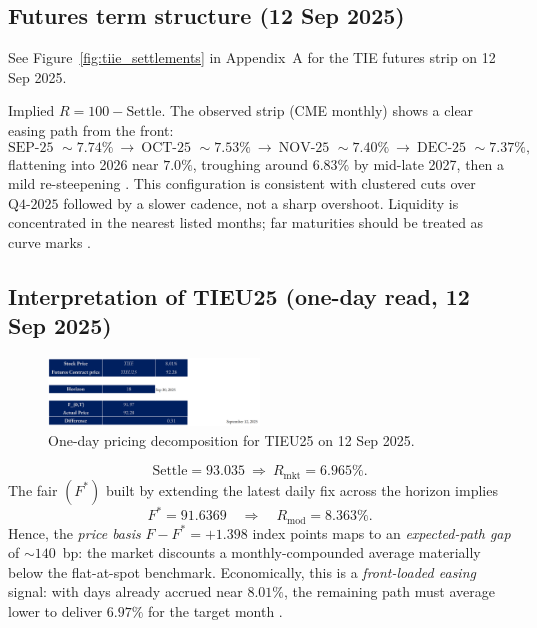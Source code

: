 \documentclass[11pt,a4paper]{article} %
\begin{document}
\subsection{Futures term structure (12 Sep 2025)}

See Figure~\ref{fig:tiie_settlements} in Appendix~A for the TIE futures strip on 12 Sep 2025.

\(\text{Implied }R = 100 - \text{Settle}\). The observed strip (CME monthly) shows a clear easing path from the front:
\[
\text{SEP-25 } \sim {7.74\%}\ \to\ \text{OCT-25 } \sim {7.53\%}\ \to\ \text{NOV-25 } \sim {7.40\%}\ \to\ \text{DEC-25 } \sim {7.37\%},
\]
flattening into 2026 near \(7.0\%\), troughing around \(6.83\%\) by mid-late 2027, then a mild re-steepening \citep{cme_tiie_monthly_quotes}. This configuration is consistent with clustered cuts over \(\text{Q4-2025}\) followed by a slower cadence, not a sharp overshoot. Liquidity is concentrated in the nearest listed months; far maturities should be treated as curve marks \citep{cme_tiie_monthly_overview,cme_tiie_monthly_quotes}.

\subsection{Interpretation of \texorpdfstring{TIEU25}{TIEU25} (one-day read, 12 Sep 2025)}

\begin{figure}[h]
  \centering
  \includegraphics[width=0.5\textwidth]{figures/tiie.png}
 \caption{One-day pricing decomposition for TIEU25 on 12 Sep 2025.}
\end{figure}


\[
\text{Settle} = {93.035}\ \Rightarrow\ R_{\text{mkt}}={6.965\%}.
\]
The fair \((F^{*})\) built by extending the latest daily fix across the horizon implies
\[
F^{*}={91.6369}\quad\Rightarrow\quad R_{\text{mod}}={8.363\%}.
\]
Hence, the \emph{price basis} \(F-F^{*}={+1.398}\) index points maps to an \emph{expected-path gap} of \(\sim{140}\)~bp: the market discounts a monthly-compounded average materially below the flat-at-spot benchmark. Economically, this is a \emph{front-loaded easing} signal: with days already accrued near \(8.01\%\), the remaining path must average lower to deliver \(6.97\%\) for the target month \citep{banxico_on_method_en,cme_tiie_monthly_method}.
\end{document}
